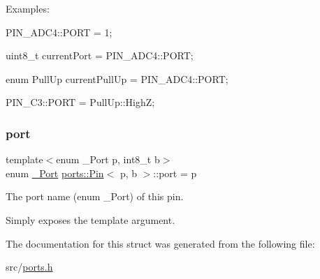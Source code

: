 Examples\+:


\begin{DoxyItemize}
\item {\ttfamily P\+I\+N\+\_\+\+A\+D\+C4\+::\+P\+O\+RT = 1;}
\item {\ttfamily uint8\+\_\+t current\+Port = P\+I\+N\+\_\+\+A\+D\+C4\+::\+P\+O\+RT;}
\item {\ttfamily enum Pull\+Up current\+Pull\+Up = P\+I\+N\+\_\+\+A\+D\+C4\+::\+P\+O\+RT;}
\item {\ttfamily P\+I\+N\+\_\+\+C3\+::\+P\+O\+RT = Pull\+Up\+::\+HighZ;} 
\end{DoxyItemize}\hypertarget{structports_1_1Pin_ad63613b8c14441d28e3f3d935da67e77}{}\label{structports_1_1Pin_ad63613b8c14441d28e3f3d935da67e77} 
\subsubsection{\texorpdfstring{port}{port}}
{\footnotesize\ttfamily template$<$enum \+\_\+\+Port p, int8\+\_\+t b$>$ \\
enum \hyperlink{namespaceports_a9949317f344930bd6ad1097e80c97b67}{\+\_\+\+Port} \hyperlink{structports_1_1Pin}{ports\+::\+Pin}$<$ p, b $>$\+::port = p\hspace{0.3cm}{\ttfamily [static]}}



The port name (enum \+\_\+\+Port) of this pin. 

Simply exposes the template argument. 

The documentation for this struct was generated from the following file\+:\begin{DoxyCompactItemize}
\item 
src/\hyperlink{ports_8h}{ports.\+h}\end{DoxyCompactItemize}
